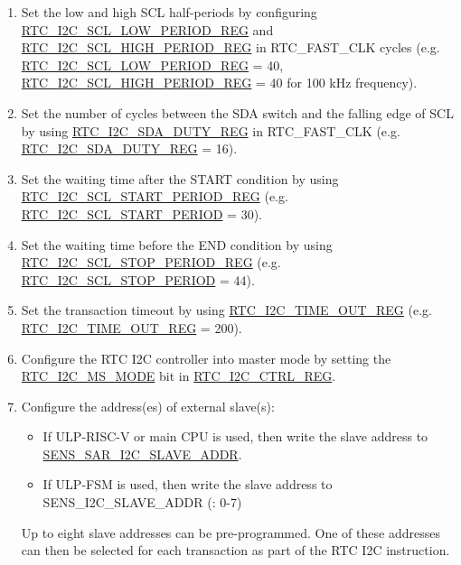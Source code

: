 \documentclass[main\_\_EN.tex]{subfiles}
\begin{document}
\begin{enumerate}
    \item Set the low and high SCL half-periods by configuring  \hyperref[fielddesc:RTCI2CSCLLOWPERIODREG]{RTC\_I2C\_SCL\_LOW\_PERIOD\_REG} and  \hyperref[fielddesc:RTCI2CSCLHIGHPERIODREG]{RTC\_I2C\_SCL\_HIGH\_PERIOD\_REG} in RTC\_FAST\_CLK cycles (e.g. \hyperref[fielddesc:RTCI2CSCLLOWPERIODREG]{RTC\_I2C\_SCL\_LOW\_PERIOD\_REG} = 40, \hyperref[fielddesc:RTCI2CSCLHIGHPERIODREG]{RTC\_I2C\_SCL\_HIGH\_PERIOD\_REG} = 40 for 100 kHz frequency).
    \item Set the number of cycles between the SDA switch and the falling edge of SCL by using  \hyperref[regdesc:RTCI2CSDADUTYREG]{RTC\_I2C\_SDA\_DUTY\_REG} in RTC\_FAST\_CLK (e.g. \hyperref[regdesc:RTCI2CSDADUTYREG]{RTC\_I2C\_SDA\_DUTY\_REG} = 16).
    \item Set the waiting time after the START condition by using  \hyperref[regdesc:RTCI2CSCLSTARTPERIODREG]{RTC\_I2C\_SCL\_START\_PERIOD\_REG} (e.g. \hyperref[fielddesc:RTCI2CSCLSTARTPERIOD]{RTC\_I2C\_SCL\_START\_PERIOD} = 30).
    \item Set the waiting time before the END condition by using  \hyperref[regdesc:RTCI2CSCLSTOPPERIODREG]{RTC\_I2C\_SCL\_STOP\_PERIOD\_REG} (e.g. \hyperref[fielddesc:RTCI2CSCLSTOPPERIOD]{RTC\_I2C\_SCL\_STOP\_PERIOD} = 44).
    \item Set the transaction timeout by using  \hyperref[fielddesc:RTCI2CTIMEOUTREG]{RTC\_I2C\_TIME\_OUT\_REG} (e.g. \hyperref[fielddesc:RTCI2CTIMEOUTREG]{RTC\_I2C\_TIME\_OUT\_REG} = 200).
    \item Configure the RTC I2C controller into master mode by setting the  \hyperref[fielddesc:RTCI2CMSMODE]{RTC\_I2C\_MS\_MODE} bit in  \hyperref[regdesc:RTCI2CCTRLREG]{RTC\_I2C\_CTRL\_REG}.
    \item Configure the address(es) of external slave(s):
    \begin{itemize}
        \item If ULP-RISC-V or main CPU is used, then write the slave address to \hyperref[fielddesc:SENSSARI2CSLAVEADDR]{SENS\_SAR\_I2C\_SLAVE\_ADDR}.
        \item If ULP-FSM is used, then write the slave address to SENS\_I2C\_SLAVE\_ADDR (: 0-7)
    \end{itemize}
    Up to eight slave addresses can be pre-programmed. One of these addresses can then be selected for each transaction as part of the RTC I2C instruction.
\end{enumerate}
\end{document}
